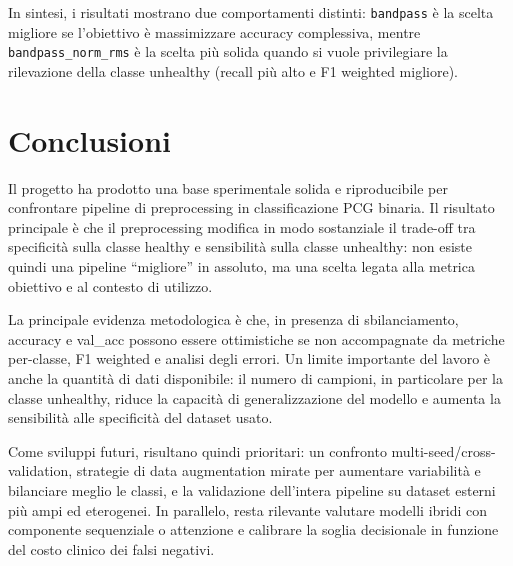 \documentclass[12pt,a4paper]{article}
\begin{document}
In sintesi, i risultati mostrano due comportamenti distinti: \texttt{bandpass} è la scelta migliore
se l'obiettivo è massimizzare accuracy complessiva, mentre \texttt{bandpass\_norm\_rms} è la scelta
più solida quando si vuole privilegiare la rilevazione della classe unhealthy (recall più alto e
F1 weighted migliore).

\section{Conclusioni}
Il progetto ha prodotto una base sperimentale solida e riproducibile per confrontare pipeline di
preprocessing in classificazione PCG binaria. Il risultato principale è che il preprocessing
modifica in modo sostanziale il trade-off tra specificità sulla classe healthy e sensibilità sulla
classe unhealthy: non esiste quindi una pipeline ``migliore'' in assoluto, ma una scelta legata
alla metrica obiettivo e al contesto di utilizzo.

La principale evidenza metodologica è che, in presenza di sbilanciamento, accuracy e val\_acc
possono essere ottimistiche se non accompagnate da metriche per-classe, F1 weighted e analisi
degli errori. Un limite importante del lavoro è anche la quantità di dati disponibile: il numero di
campioni, in particolare per la classe unhealthy, riduce la capacità di generalizzazione del
modello e aumenta la sensibilità alle specificità del dataset usato.

Come sviluppi futuri, risultano quindi prioritari: un confronto multi-seed/cross-validation,
strategie di data augmentation mirate per aumentare variabilità e bilanciare meglio le classi, e la
validazione dell'intera pipeline su dataset esterni più ampi ed eterogenei. In parallelo, resta
rilevante valutare modelli ibridi con componente sequenziale o attenzione e calibrare la soglia
decisionale in funzione del costo clinico dei falsi negativi.
\end{document}
